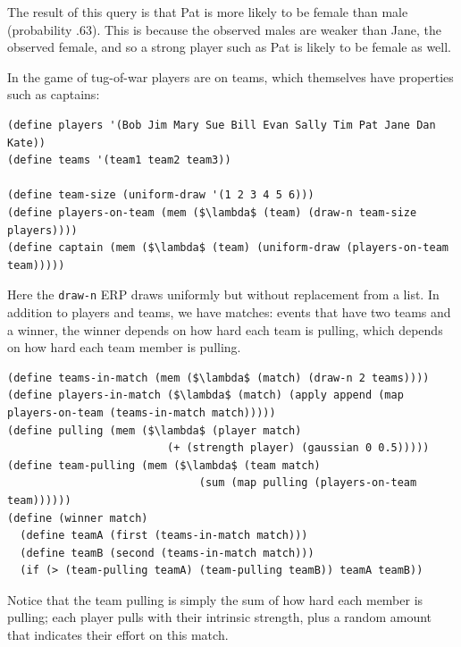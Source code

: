 \documentclass[pdfextras]{handbook}
\begin{document}
The result of this query is that Pat is more likely to be female than male (probability .63). 
This is because the observed males are weaker than Jane, the observed female, and so a strong player such as Pat is likely to be female as well.

In the game of tug-of-war players are on teams, which themselves have properties such as captains:
\begin{lstlisting}[mathescape]
(define players '(Bob Jim Mary Sue Bill Evan Sally Tim Pat Jane Dan Kate))
(define teams '(team1 team2 team3))

(define team-size (uniform-draw '(1 2 3 4 5 6)))
(define players-on-team (mem ($\lambda$ (team) (draw-n team-size players))))
(define captain (mem ($\lambda$ (team) (uniform-draw (players-on-team team)))))
\end{lstlisting}
%
Here the \lstinline{draw-n} ERP draws uniformly but without replacement from a list.
%
In addition to players and teams, we have matches: events that have two teams and a winner, the winner depends on how hard each team is pulling, which depends on how hard each team member is pulling.
\begin{lstlisting}[mathescape]
(define teams-in-match (mem ($\lambda$ (match) (draw-n 2 teams))))
(define players-in-match ($\lambda$ (match) (apply append (map players-on-team (teams-in-match match)))))
(define pulling (mem ($\lambda$ (player match) 
                         (+ (strength player) (gaussian 0 0.5)))))
(define team-pulling (mem ($\lambda$ (team match) 
                              (sum (map pulling (players-on-team team))))))
(define (winner match) 
  (define teamA (first (teams-in-match match)))
  (define teamB (second (teams-in-match match)))
  (if (> (team-pulling teamA) (team-pulling teamB)) teamA teamB))
\end{lstlisting}
Notice that the team pulling is simply the sum of how hard each member is pulling; each player pulls with their intrinsic strength, plus a random amount that indicates their effort on this match. 
 
\end{document}
